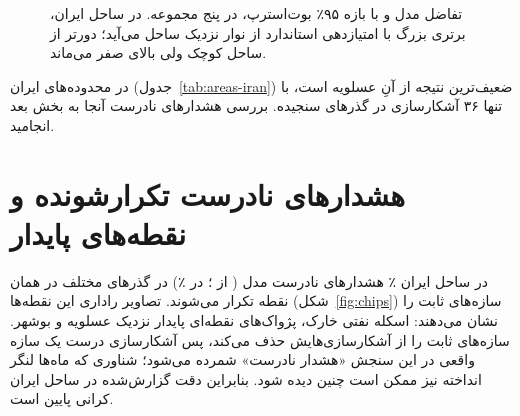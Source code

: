 \begin{figure}[htbp]
\centering
{}
\caption[تفاضل مدل و  در پنج مجموعه]{تفاضل  مدل و  با بازه ۹۵٪ بوت‌استرپ، در پنج مجموعه. در ساحل ایران،
برتری بزرگ با امتیازدهی استاندارد از نوار نزدیک ساحل می‌آید؛ دورتر از ساحل کوچک ولی بالای صفر
می‌ماند.}
\label{fig:generalisation}
\end{figure}



در محدوده‌های ایران (جدول~\ref{tab:areas-iran}) ضعیف‌ترین نتیجه از آنِ عسلویه است، با تنها
۳۶ آشکارسازی  در گذرهای سنجیده. بررسی هشدارهای نادرست آنجا به بخش بعد انجامید.

\section{هشدارهای نادرست تکرارشونده و نقطه‌های پایدار}
در ساحل ایران ٪ هشدارهای نادرست مدل ( از ؛ در  ٪)
در گذرهای مختلف در همان نقطه تکرار می‌شوند. تصاویر راداری این نقطه‌ها
(شکل~\ref{fig:chips}) سازه‌های ثابت را نشان می‌دهند: اسکله نفتی خارک، پژواک‌های نقطه‌ای پایدار
نزدیک عسلویه و بوشهر.  سازه‌های ثابت را از آشکارسازی‌هایش حذف می‌کند، پس آشکارسازی
درست یک سازه واقعی در این سنجش «هشدار نادرست» شمرده می‌شود؛ شناوری که ماه‌ها لنگر انداخته
نیز ممکن است چنین دیده شود. بنابراین دقت گزارش‌شده در ساحل ایران کرانی پایین است.

